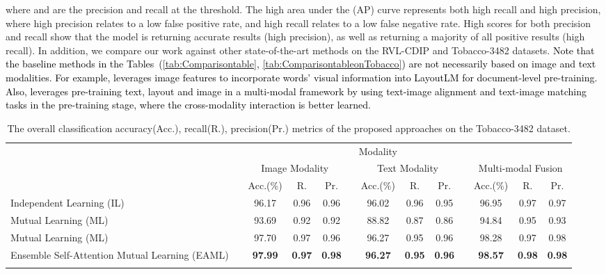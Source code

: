 \documentclass[twocolumn]{svjour3}
\begin{document}
where  and  are the precision and recall at the  threshold. The high area under the (AP) curve represents both high recall and high precision, where high precision relates to a low false positive rate, and high recall relates to a low false negative rate. High scores for both precision and recall show that the model is returning accurate results (high precision), as well as returning a majority of all positive results (high recall). 
In addition, we compare our work against other state-of-the-art methods on the RVL-CDIP and Tobacco-3482 datasets. \textcolor{black}{Note that the baseline methods in the Tables~(\ref{tab:Comparisontable}, \ref{tab:ComparisontableonTobacco}) are not necessarily based on image and text modalities. For example, \cite{Xu2020LayoutLMPO} leverages image features to incorporate words' visual information into LayoutLM for document-level pre-training. Also, \cite{Xu2020LayoutLMv2MP} leverages pre-training text, layout and image in a multi-modal framework by using text-image alignment and text-image matching tasks in the pre-training stage, where the cross-modality interaction is better learned.}

\setlength\tabcolsep{3 pt}
\begin{table*}[tbh]
\small
\centering
\caption{The overall classification accuracy(Acc.), recall(R.), precision(Pr.) metrics of the proposed approaches on the Tobacco-3482 dataset.}
\resizebox{\textwidth}{!} {\begin{tabular}{lcccccccccccc}
    \hline\noalign{\smallskip}
     \multicolumn{1}{c}{} && \multicolumn{9}{c}{Modality} \\
         \noalign{\smallskip}\hline\noalign{\smallskip}
         \multicolumn{1}{c}{Method} && \multicolumn{3}{c}{Image Modality} && \multicolumn{3}{c}{Text Modality} && \multicolumn{3}{c}{Multi-modal Fusion} \\
         \noalign{\smallskip}\hline\noalign{\smallskip}
          && Acc.(\%) & R. & Pr. && Acc.(\%) & R. & Pr. && Acc.(\%) & R. & Pr.\\
         \cmidrule{3-5}\cmidrule{7-9}\cmidrule{11-13}
         Independent Learning (IL) && 96.17 & 0.96 & 0.96 && 96.02 & 0.96 & 0.95 && 96.95 & 0.97 & 0.97 \\
         Mutual Learning (ML) && 93.69 & 0.92 & 0.92 && 88.82 & 0.87 & 0.86 && 94.84 & 0.95 & 0.93 \\
         Mutual Learning (ML) && 97.70 & 0.97 & 0.96 && 96.27 & 0.95 & 0.96 && 98.28 & 0.97 & 0.98\\
         Ensemble Self-Attention Mutual Learning (EAML) && \textbf{97.99} & \textbf{0.97} & \textbf{0.98} && \textbf{96.27} & \textbf{0.95} & \textbf{0.96} && \textbf{98.57} & \textbf{0.98} & \textbf{0.98} \\
    \noalign{\smallskip}\hline
    \end{tabular}}
    \label{tab:ResultsonTobacco}
\end{table*}
\end{document}
